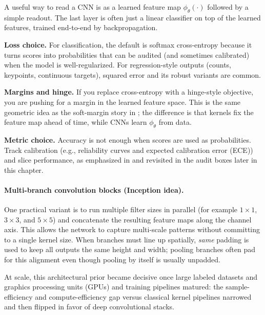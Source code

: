 \begin{tcolorbox}[summarybox, title={Losses, metrics, and the ``CNN as features'' viewpoint}]
A useful way to read a CNN is as a learned feature map \(\phi_\theta(\cdot)\) followed by a simple readout. The last layer is often just a linear classifier on top of the learned features, trained end-to-end by backpropagation.

\textbf{Loss choice.} For classification, the default is softmax cross\hyp{}entropy because it turns scores into probabilities that can be audited (and sometimes calibrated) when the model is well-regularized. For regression-style outputs (counts, keypoints, continuous targets), squared error and its robust variants are common.

\textbf{Margins and hinge.} If you replace cross\hyp{}entropy with a hinge-style objective, you are pushing for a margin in the learned feature space. This is the same geometric idea as the soft-margin story in ; the difference is that kernels fix the feature map ahead of time, while CNNs learn \(\phi_\theta\) from data.

\textbf{Metric choice.} Accuracy is not enough when scores are used as probabilities. Track calibration (e.g., reliability curves and expected calibration error (ECE)) and slice performance, as emphasized in  and revisited in the audit boxes later in this chapter.
\end{tcolorbox}

\paragraph{Multi-branch convolution blocks (Inception idea).}
\label{sec:cnn_multi_branch_convolution_blocks_inception_idea}
One practical variant is to run multiple filter sizes in parallel (for example \(1\times1\), \(3\times3\), and \(5\times5\)) and concatenate the resulting feature maps along the channel axis. This allows the network to capture multi-scale patterns without committing to a single kernel size. When branches must line up spatially, \emph{same} padding is used to keep all outputs the same height and width; pooling branches often pad for this alignment even though pooling by itself is usually unpadded.

At scale, this architectural prior became decisive once large labeled datasets and graphics processing units (GPUs) and training pipelines matured: the sample-efficiency and compute-efficiency gap versus classical kernel pipelines narrowed and then flipped in favor of deep convolutional stacks.

